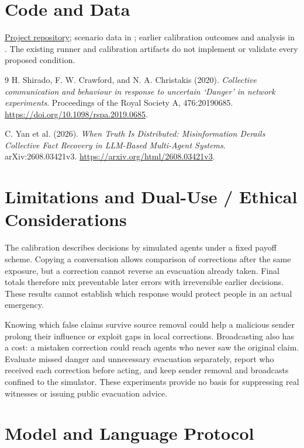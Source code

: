 \documentclass[11pt]{article}
\begin{document}
\section*{Code and Data}
\href{https://github.com/nhat117/AdoptionAIHackathon}{Project repository}; scenario data in ; earlier calibration outcomes and analysis in . The existing runner and calibration artifacts do not implement or validate every proposed condition.

\clearpage
\begin{thebibliography}{9}
 H. Shirado, F. W. Crawford, and N. A. Christakis (2020). \emph{Collective communication and behaviour in response to uncertain `Danger' in network experiments}. Proceedings of the Royal Society A, 476:20190685. \url{https://doi.org/10.1098/rspa.2019.0685}.

 C. Yan et al. (2026). \emph{When Truth Is Distributed: Misinformation Derails Collective Fact Recovery in LLM-Based Multi-Agent Systems}. arXiv:2608.03421v3. \url{https://arxiv.org/html/2608.03421v3}.
\end{thebibliography}
\clearpage
\appendix
\section{Limitations and Dual-Use / Ethical Considerations}
The calibration describes decisions by simulated agents under a fixed payoff scheme. Copying a conversation allows comparison of corrections after the same exposure, but a correction cannot reverse an evacuation already taken. Final totals therefore mix preventable later errors with irreversible earlier decisions. These results cannot establish which response would protect people in an actual emergency.

Knowing which false claims survive source removal could help a malicious sender prolong their influence or exploit gaps in local corrections. Broadcasting also has a cost: a mistaken correction could reach agents who never saw the original claim. Evaluate missed danger and unnecessary evacuation separately, report who received each correction before acting, and keep sender removal and broadcasts confined to the simulator. These experiments provide no basis for suppressing real witnesses or issuing public evacuation advice.

\section{Model and Language Protocol}
\end{document}
